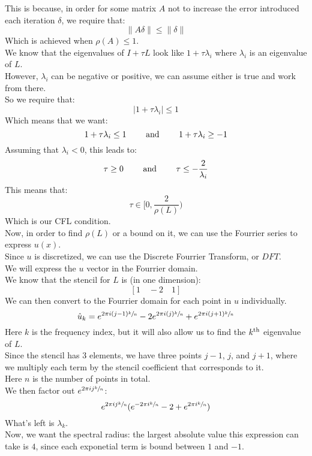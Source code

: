 \documentclass[12pt]{article}
\begin{document}
This is because, in order for some matrix $A$ not to increase
the error introduced each iteration $\delta$,
we require that:
\[ \|A\delta\| \leq \|\delta\| \]
Which is achieved when $\rho(A) \leq 1$. \\

We know that the eigenvalues of $I + \tau L$
look like $1 + \tau \lambda_i$ where $\lambda_i$
is an eigenvalue of $L$. \\
However, $\lambda_i$ can be negative or positive,
we can assume either is true and work from there. \\

So we require that:
\[ |1 + \tau \lambda_i| \leq 1 \]
Which means that we want:
\[ 1 + \tau \lambda_i \leq 1 \qquad \text{ and } \qquad 
1 + \tau \lambda_i \geq -1 \]
Assuming that $\lambda_i < 0$, this leads to:
\[ \tau \geq 0 \qquad \text{ and } \qquad 
\tau \leq -\dfrac{2}{\lambda_i} \]
This means that:
\[ \tau \in \Big[0, \dfrac{2}{\rho(L)}\Big) \]
Which is our CFL condition. \\

Now, in order to find $\rho(L)$ or a bound on it,
we can use the Fourrier series to express $u(x)$. \\
Since $u$ is discretized, we can use the Discrete
Fourrier Transform, or $DFT$. \\
We will express the $u$ vector in the Fourrier domain. \\

We know that the stencil for $L$ is (in one dimension):
\[ [1 \quad -2 \quad 1] \]
We can then convert to the Fourrier domain for each
point in $u$ individually. \\
\[ \hat{u}_k = e^{2 \pi i (j-1) \sfrac{k}{n}}
-2 e^{2 \pi i (j) \sfrac{k}{n}} 
+ e^{2 \pi i (j+1) \sfrac{k}{n}}\]
Here $k$ is the frequency index, but it will
also allow us to find the $k^{\text{th}}$ eigenvalue of $L$. \\
Since the stencil has 3 elements, we have three points
$j-1$, $j$, and $j+1$,
where we multiply each term by the stencil coefficient
that corresponds to it. \\
Here $n$ is the number of points in total. \\
We then factor out $e^{2 \pi i j \sfrac{k}{n}}$:
\[ e^{2 \pi i j \sfrac{k}{n}}(e^{-2 \pi i \sfrac{k}{n}}
-2 + e^{2 \pi i \sfrac{k}{n}}) \]
What's left is $\lambda_k$. \\
Now, we want the spectral radius: the largest absolute
value this expression can take is $4$, since 
each exponetial term is bound between $1$ and $-1$. \\
\end{document}
